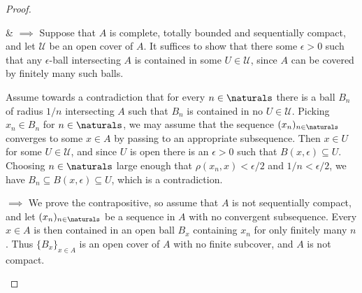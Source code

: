 \documentclass[article, a4paper, 11pt, oneside]{memoir}
\numberwithin{equation}{chapter}
\newcommand{\calU}{\mathcal{U}}
\begin{document}
\begin{proof}
\begin{proofsec}
    \item[\subcref{enum:complete-totally-bounded} \& \subcref{enum:sequentially-compact} $\implies$ \subcref{enum:compact}]
    Suppose that $A$ is complete, totally bounded and sequentially compact, and let $\calU$ be an open cover of $A$. It suffices to show that there some $\epsilon > 0$ such that any $\epsilon$-ball intersecting $A$ is contained in some $U \in \calU$, since $A$ can be covered by finitely many such balls.

    Assume towards a contradiction that for every $n \in \naturals$ there is a ball $B_n$ of radius $1/n$ intersecting $A$ such that $B_n$ is contained in no $U \in \calU$. Picking $x_n \in B_n$ for $n \in \naturals$, we may assume that the sequence $(x_n)_{n\in\naturals}$ converges to some $x \in A$ by passing to an appropriate subsequence. Then $x \in U$ for some $U \in \calU$, and since $U$ is open there is an $\epsilon > 0$ such that $B(x,\epsilon) \subseteq U$. Choosing $n \in \naturals$ large enough that $\rho(x_n,x) < \epsilon/2$ and $1/n < \epsilon/2$, we have $B_n \subseteq B(x,\epsilon) \subseteq U$, which is a contradiction.

    \item[\subcref{enum:compact} $\implies$ \subcref{enum:sequentially-compact}]
    We prove the contrapositive, so assume that $A$ is not sequentially compact, and let $(x_n)_{n\in\naturals}$ be a sequence in $A$ with no convergent subsequence. Every $x \in A$ is then contained in an open ball $B_x$ containing $x_n$ for only finitely many $n$. Thus $\{B_x\}_{x \in A}$ is an open cover of $A$ with no finite subcover, and $A$ is not compact.
\end{proofsec}
\end{proof}



\end{document}

